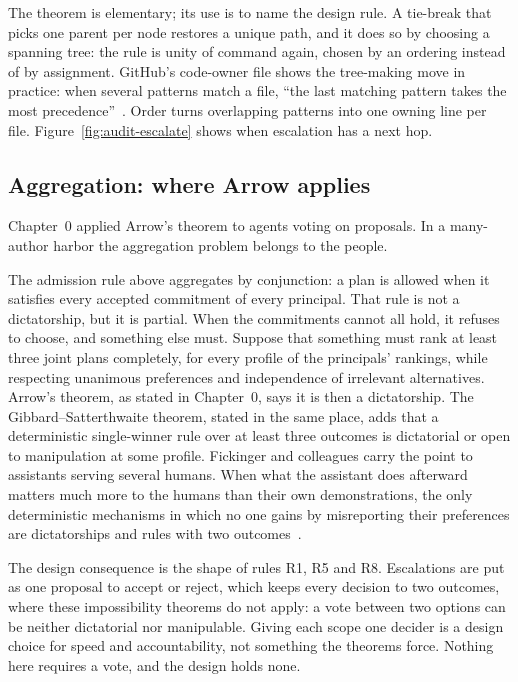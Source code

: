 The theorem is elementary; its use is to name the design rule. A tie-break
that picks one parent per node restores a unique path, and it does so by
choosing a spanning tree: the rule is unity of command again, chosen by an
ordering instead of by assignment. GitHub's code-owner file shows the tree-making move in
practice: when several patterns match a file, ``the last matching pattern
takes the most precedence''~. Order turns overlapping
patterns into one owning line per file.
Figure~\ref{fig:audit-escalate} shows when escalation has a next hop.



\subsection{Aggregation: where Arrow applies}\label{sec:ls-many-authors-aggregation}

Chapter~0 applied Arrow's theorem to agents voting on proposals. In a
many-author harbor the aggregation problem belongs to the people.

The admission rule above aggregates by conjunction: a plan is allowed when
it satisfies every accepted commitment of every principal. That rule is not a
dictatorship, but it is partial. When the commitments cannot all hold, it
refuses to choose, and something else must. Suppose that something must rank
at least three joint plans completely, for every profile of the principals'
rankings, while respecting unanimous preferences and independence of
irrelevant alternatives. Arrow's theorem, as stated in Chapter~0, says it is
then a dictatorship. The Gibbard--Satterthwaite theorem, stated in the same
place, adds that a deterministic single-winner rule over at least three
outcomes is dictatorial or open to manipulation at some profile. Fickinger and colleagues carry the point to
assistants serving several humans. When what the assistant does afterward
matters much more to the humans than their own demonstrations, the only
deterministic mechanisms in which no one gains by misreporting their
preferences are dictatorships and rules with two outcomes~.

The design consequence is the shape of rules R1, R5 and R8. Escalations are put
as one proposal to accept or reject, which keeps every decision to two
outcomes, where these impossibility theorems do not apply: a vote between two
options can be neither dictatorial nor manipulable. Giving each scope one
decider is a design choice for speed and accountability, not something the
theorems force. Nothing here requires a vote, and the design holds none.

